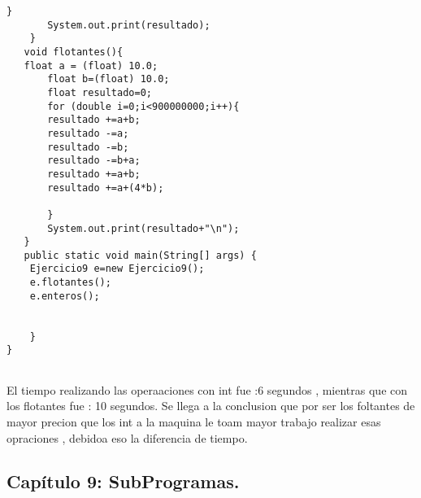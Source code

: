 \documentclass[12pt,oneside]{article}
\begin{document}
\begin{itemize}
\begin{lstlisting}[frame=single]
       }
       System.out.print(resultado);
    }
   void flotantes(){
   float a = (float) 10.0;
       float b=(float) 10.0;
       float resultado=0;
       for (double i=0;i<900000000;i++){
       resultado +=a+b;
       resultado -=a;
       resultado -=b;
       resultado -=b+a;
       resultado +=a+b;
       resultado +=a+(4*b);
       
       }
       System.out.print(resultado+"\n");
   }
   public static void main(String[] args) {
    Ejercicio9 e=new Ejercicio9();
    e.flotantes();
    e.enteros();
    
    
    }
}
 

\end{lstlisting}

El tiempo realizando las operaaciones con int fue :6 segundos ,   mientras que con los flotantes fue : 10 segundos.    Se llega a la conclusion que por ser los foltantes de mayor precion que los int a la maquina le toam mayor trabajo realizar esas opraciones , debidoa  eso la diferencia de tiempo. \\

\end{itemize}

\subsection{Capítulo 9: SubProgramas.}

%

        




\end{document}
